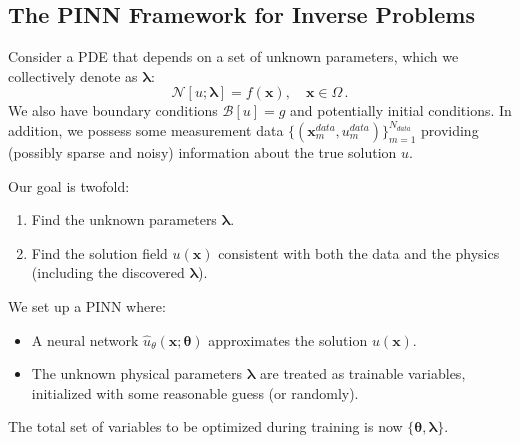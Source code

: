 \subsection{The PINN Framework for Inverse Problems}

Consider a PDE that depends on a set of unknown parameters, which we collectively denote as $\boldsymbol{\lambda}$:
%
\begin{equation}
\mathcal{N}[u; \boldsymbol{\lambda}] = f(\mathbf{x}), \quad \mathbf{x} \in \Omega \,.
\label{eq:pde_inverse}
\end{equation}
%
We also have boundary conditions $\mathcal{B}[u] = g$ and potentially initial conditions. In addition, we possess some measurement data $\{(\mathbf{x}_m^{data}, u_m^{data})\}_{m=1}^{N_{data}}$ providing (possibly sparse and noisy) information about the true solution $u$.

Our goal is twofold:
\begin{enumerate}
    \item Find the unknown parameters $\boldsymbol{\lambda}$.
    \item Find the solution field $u(\mathbf{x})$ consistent with both the data and the physics (including the discovered $\boldsymbol{\lambda}$).
\end{enumerate}

We set up a PINN where:
\begin{itemize}
    \item A neural network $\hat{u}_\theta(\mathbf{x}; \boldsymbol{\theta})$ approximates the solution $u(\mathbf{x})$.
    \item The unknown physical parameters $\boldsymbol{\lambda}$ are treated as trainable variables, initialized with some reasonable guess (or randomly).
\end{itemize}
The total set of variables to be optimized during training is now $\{\boldsymbol{\theta}, \boldsymbol{\lambda}\}$.

